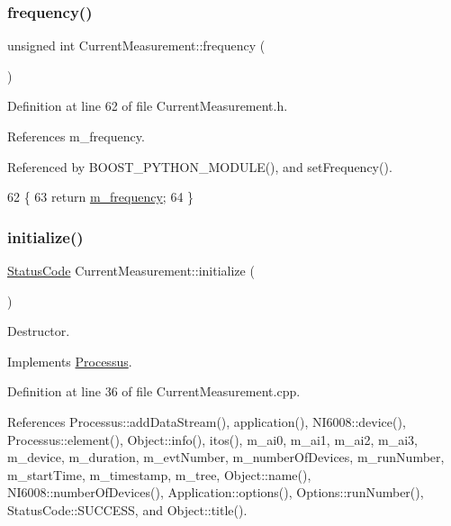 \subsubsection{\texorpdfstring{frequency()}{frequency()}}
{\footnotesize\ttfamily unsigned int Current\+Measurement\+::frequency (\begin{DoxyParamCaption}{ }\end{DoxyParamCaption})\hspace{0.3cm}{\ttfamily [inline]}}



Definition at line 62 of file Current\+Measurement.\+h.



References m\+\_\+frequency.



Referenced by B\+O\+O\+S\+T\+\_\+\+P\+Y\+T\+H\+O\+N\+\_\+\+M\+O\+D\+U\+L\+E(), and set\+Frequency().


\begin{DoxyCode}
62                           \{
63     \textcolor{keywordflow}{return} \hyperlink{classCurrentMeasurement_a66e12903825632c0434e3b7cf929a960}{m\_frequency};
64   \}
\end{DoxyCode}
\mbox{\label{classCurrentMeasurement_a88d397682cb5847d5710d08544b6f4c6}} 
\subsubsection{\texorpdfstring{initialize()}{initialize()}}
{\footnotesize\ttfamily \hyperlink{classStatusCode}{Status\+Code} Current\+Measurement\+::initialize (\begin{DoxyParamCaption}{ }\end{DoxyParamCaption})\hspace{0.3cm}{\ttfamily [virtual]}}



Destructor. 



Implements \hyperlink{classProcessus_aee88ad7b77ae7319cf8b128e9dd2ea11}{Processus}.



Definition at line 36 of file Current\+Measurement.\+cpp.



References Processus\+::add\+Data\+Stream(), application(), N\+I6008\+::device(), Processus\+::element(), Object\+::info(), itos(), m\+\_\+ai0, m\+\_\+ai1, m\+\_\+ai2, m\+\_\+ai3, m\+\_\+device, m\+\_\+duration, m\+\_\+evt\+Number, m\+\_\+number\+Of\+Devices, m\+\_\+run\+Number, m\+\_\+start\+Time, m\+\_\+timestamp, m\+\_\+tree, Object\+::name(), N\+I6008\+::number\+Of\+Devices(), Application\+::options(), Options\+::run\+Number(), Status\+Code\+::\+S\+U\+C\+C\+E\+SS, and Object\+::title().



